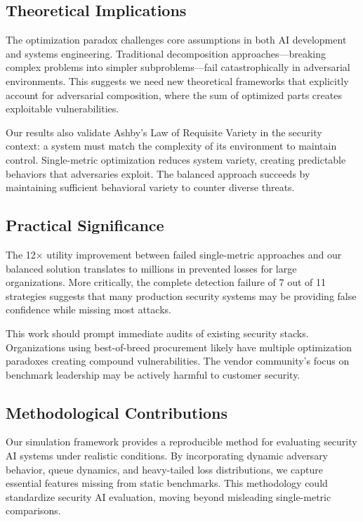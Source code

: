 \documentclass[10pt,conference]{IEEEtran}
\begin{document}
\subsection{Theoretical Implications}

The optimization paradox challenges core assumptions in both AI development and systems engineering. Traditional decomposition approaches---breaking complex problems into simpler subproblems---fail catastrophically in adversarial environments. This suggests we need new theoretical frameworks that explicitly account for adversarial composition, where the sum of optimized parts creates exploitable vulnerabilities.

Our results also validate Ashby's Law of Requisite Variety in the security context: a system must match the complexity of its environment to maintain control. Single-metric optimization reduces system variety, creating predictable behaviors that adversaries exploit. The balanced approach succeeds by maintaining sufficient behavioral variety to counter diverse threats.

\subsection{Practical Significance}

The 12$\times$ utility improvement between failed single-metric approaches and our balanced solution translates to millions in prevented losses for large organizations. More critically, the complete detection failure of 7 out of 11 strategies suggests that many production security systems may be providing false confidence while missing most attacks.

This work should prompt immediate audits of existing security stacks. Organizations using best-of-breed procurement likely have multiple optimization paradoxes creating compound vulnerabilities. The vendor community's focus on benchmark leadership may be actively harmful to customer security.

\subsection{Methodological Contributions}

Our simulation framework provides a reproducible method for evaluating security AI systems under realistic conditions. By incorporating dynamic adversary behavior, queue dynamics, and heavy-tailed loss distributions, we capture essential features missing from static benchmarks. This methodology could standardize security AI evaluation, moving beyond misleading single-metric comparisons.
\end{document}
